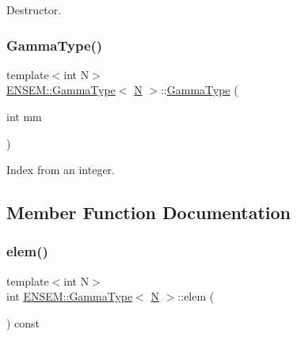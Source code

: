 Destructor. 

\mbox{\label{classENSEM_1_1GammaType_ab93a83aeee6b442968d78f30cb6b4a65}} 
\subsubsection{\texorpdfstring{GammaType()}{GammaType()}\hspace{0.1cm}{\footnotesize\ttfamily [6/6]}}
{\footnotesize\ttfamily template$<$int N$>$ \\
\mbox{\hyperlink{classENSEM_1_1GammaType}{E\+N\+S\+E\+M\+::\+Gamma\+Type}}$<$ \mbox{\hyperlink{adat__devel_2lib_2hadron_2operator__name__util_8cc_a7722c8ecbb62d99aee7ce68b1752f337}{N}} $>$\+::\mbox{\hyperlink{classENSEM_1_1GammaType}{Gamma\+Type}} (\begin{DoxyParamCaption}\item[{int}]{mm }\end{DoxyParamCaption})\hspace{0.3cm}{\ttfamily [inline]}}



Index from an integer. 



\subsection{Member Function Documentation}
\mbox{\label{classENSEM_1_1GammaType_a2813c3878cd269c7a37c588875682705}} 
\subsubsection{\texorpdfstring{elem()}{elem()}\hspace{0.1cm}{\footnotesize\ttfamily [1/3]}}
{\footnotesize\ttfamily template$<$int N$>$ \\
int \mbox{\hyperlink{classENSEM_1_1GammaType}{E\+N\+S\+E\+M\+::\+Gamma\+Type}}$<$ \mbox{\hyperlink{adat__devel_2lib_2hadron_2operator__name__util_8cc_a7722c8ecbb62d99aee7ce68b1752f337}{N}} $>$\+::elem (\begin{DoxyParamCaption}{ }\end{DoxyParamCaption}) const\hspace{0.3cm}{\ttfamily [inline]}}



